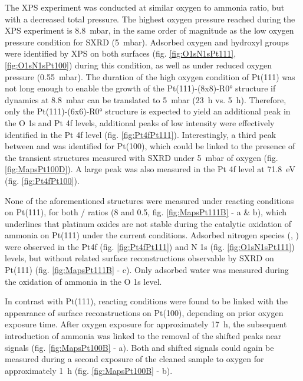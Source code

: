 The XPS experiment was conducted at similar oxygen to ammonia ratio, but with a decreased total pressure.
The highest oxygen pressure reached during the XPS experiment is \qty{8.8}{\milli\bar}, in the same order of magnitude as the low oxygen pressure condition for SXRD (\qty{5}{\milli\bar}).
Adsorbed oxygen and hydroxyl groups were identified by XPS on both surfaces (fig. \ref{fig:O1sN1sPt111}, \ref{fig:O1sN1sPt100}) during this condition, as well as under reduced oxygen pressure (\qty{0.55}{\milli\bar}).
The duration of the high oxygen condition of Pt(111) was not long enough to enable the growth of the Pt(111)-(8x8)-R\ang{0} structure if dynamics at \qty{8.8}{\milli\bar} can be translated to \qty{5}{\milli\bar} (\qty{23}{\hour} vs. \qty{5}{\hour}).
Therefore, only the Pt(111)-(6x6)-R\ang{0} structure is expected to yield an additional peak in the O 1s and Pt 4f levels, additional peaks of low intensity were effectively identified in the Pt 4f level (fig. \ref{fig:Pt4fPt111}).
Interestingly, a third peak between  and  was identified for Pt(100), which could be linked to the presence of the transient structures measured with SXRD under \qty{5}{\milli\bar} of oxygen (fig. \ref{fig:MapsPt100D}).
A large peak was also measured in the Pt 4f level at \qty{71.8}{\eV} (fig. \ref{fig:Pt4fPt100}).

None of the aforementioned structures were measured under reacting conditions on Pt(111), for both / ratios (\num{8} and \num{0.5}, fig. \ref{fig:MapsPt111B} - a \& b), which underlines that platinum oxides are not stable during the catalytic oxidation of ammonia on Pt(111) under the current conditions.
Adsorbed nitrogen species (, ) were observed in the Pt4f (fig. \ref{fig:Pt4fPt111}) and N 1s (fig. \ref{fig:O1sN1sPt111}) levels, but without related surface reconstructions observable by SXRD on Pt(111) (fig. \ref{fig:MapsPt111B} - c).
Only adsorbed water was measured during the oxidation of ammonia in the O 1s level.

In contrast with Pt(111), reacting conditions were found to be linked with the appearance of surface reconstructions on Pt(100), depending on prior oxygen exposure time.
After oxygen exposure for approximately \qty{17}{\hour}, the subsequent introduction of ammonia was linked to the removal of the shifted peaks near  signals (fig. \ref{fig:MapsPt100B} - a).
Both  and shifted signals could again be measured during a second exposure of the cleaned sample to oxygen for approximately \qty{1}{\hour} (fig. \ref{fig:MapsPt100B} - b).

